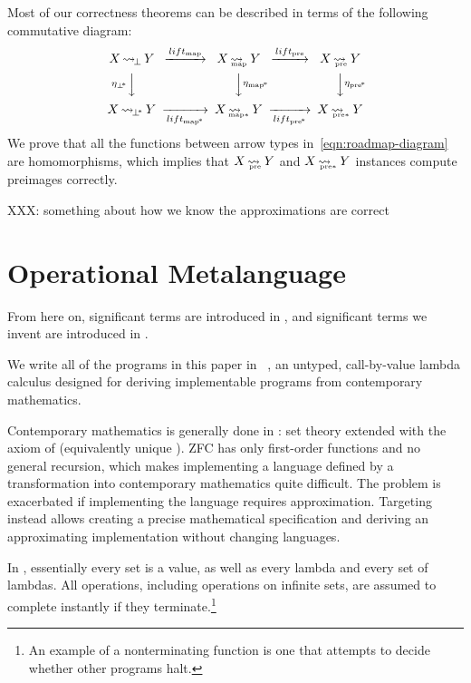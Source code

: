 \documentclass[preprint]{sigplanconf}
\newcommand{\arrow}{\rightsquigarrow}
\newcommand{\arrowlift}{\ensuremath{lift}}
\DeclareMathOperator{\botto}{\arrow_{\mspace{-3mu}\bot}}
\newcommand{\map}{_\mathrm{map}}
\DeclareMathOperator{\mapto}{\arrow_{\mspace{-21mu}\map}}
\newcommand{\liftmap}{\arrowlift\map}
\newcommand{\pre}{_\mathrm{pre}}
\DeclareMathOperator{\preto}{\arrow_{\mspace{-19mu}\pre}}
\newcommand{\liftpre}{\arrowlift\pre}
\newcommand{\pbot}{{\bot^{\mspace{-4mu}*}}}
\DeclareMathOperator{\pbotto}{\arrow_{\mspace{-3mu}\pbot}}
\newcommand{\pmap}{_\mathrm{map^{\mspace{-2mu}*}}}
\DeclareMathOperator{\pmapto}{\arrow_{\mspace{-22mu}_{\mathrm{map*}}}}
\newcommand{\liftpmap}{\arrowlift\pmap}
\newcommand{\ppre}{_\mathrm{pre^{\mspace{-2mu}*}}}
\DeclareMathOperator{\ppreto}{\arrow_{\mspace{-19mu}_{\mathrm{pre*}}}}
\newcommand{\liftppre}{\arrowlift\ppre}
\begin{document}
Most of our correctness theorems can be described in terms of the following commutative diagram:
\begin{equation}
\begin{CD}
X \botto Y   @>\liftmap>>   X \mapto Y   @>\liftpre>>   X \preto Y \\
@V{\eta_\pbot}VV             @VV{\eta\pmap}V              @VV{\eta\ppre}V\\
X \pbotto Y  @>>\liftpmap>  X \pmapto Y  @>>\liftppre>  X \ppreto Y
\end{CD}
\label{eqn:roadmap-diagram}
\end{equation}
We prove that all the functions between arrow types in~\eqref{eqn:roadmap-diagram} are homomorphisms, which implies that $X \preto Y$ and $X \ppreto Y$ instances compute preimages correctly.

XXX: something about how we know the approximations are correct



\section{Operational Metalanguage}

From here on, significant terms are introduced in , and significant terms we invent are introduced in .

We write all of the programs in this paper in \lzfclang~\cite{cit:toronto-2012flops-lzfc}, an untyped, call-by-value lambda calculus designed for deriving implementable programs from contemporary mathematics.

Contemporary mathematics is generally done in :  set theory extended with the axiom of  (equivalently unique ).
ZFC has only first-order functions and no general recursion, which makes implementing a language defined by a transformation into contemporary mathematics quite difficult.
The problem is exacerbated if implementing the language requires approximation.
Targeting \lzfclang instead allows creating a precise mathematical specification and deriving an approximating implementation without changing languages.

In \lzfclang, essentially every set is a value, as well as every lambda and every set of lambdas.
All operations, including operations on infinite sets, are assumed to complete instantly if they terminate.\footnote{An
example of a nonterminating \lzfclang function is one that attempts to decide whether other \lzfclang programs halt.}
\end{document}
